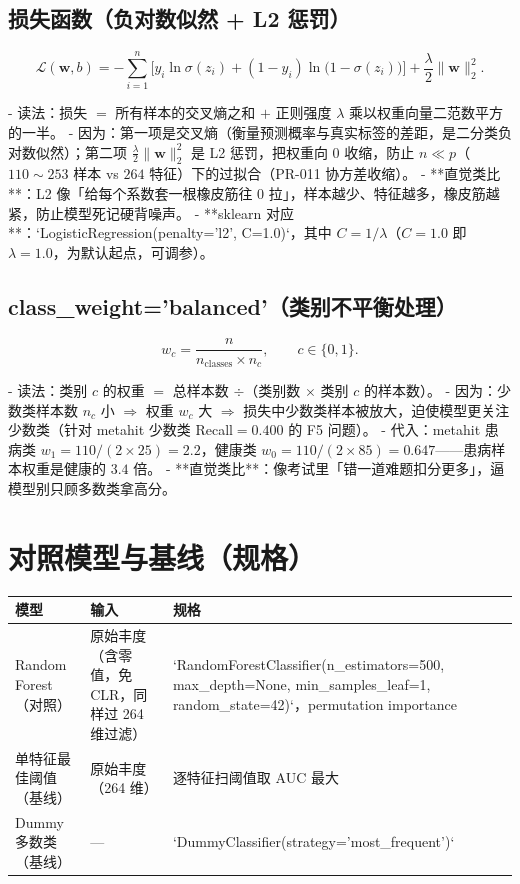 \documentclass{internal-report}
\begin{document}
\subsection{损失函数（负对数似然 + L2 惩罚）}

\begin{equation}
  \mathcal{L}(\mathbf{w},b) =
  -\sum_{i=1}^{n}\Big[y_i\ln\sigma(z_i) + (1-y_i)\ln\big(1-\sigma(z_i)\big)\Big]
  + \frac{\lambda}{2}\lVert\mathbf{w}\rVert_2^2.
  \label{eq:loss}
\end{equation}

- 读法：损失 $=$ 所有样本的交叉熵之和 $+$ 正则强度 $\lambda$ 乘以权重向量二范数平方的一半。
- 因为：第一项是交叉熵（衡量预测概率与真实标签的差距，是二分类负对数似然）；第二项 $\frac{\lambda}{2}\lVert\mathbf{w}\rVert_2^2$ 是 L2 惩罚，把权重向 0 收缩，防止 $n\ll p$（$110\sim253$ 样本 vs $264$ 特征）下的过拟合（PR-011 协方差收缩）。
- **直觉类比**：L2 像「给每个系数套一根橡皮筋往 0 拉」，样本越少、特征越多，橡皮筋越紧，防止模型死记硬背噪声。
- **sklearn 对应**：`LogisticRegression(penalty='l2', C=1.0)`，其中 $C=1/\lambda$（$C=1.0$ 即 $\lambda=1.0$，为默认起点，可调参）。

\subsection{class\_weight='balanced'（类别不平衡处理）}
\label{sec:classweight}

\begin{equation}
  w_c = \frac{n}{n_{\text{classes}} \times n_c},
  \qquad
  c \in \{0,1\}.
  \label{eq:classweight}
\end{equation}

- 读法：类别 $c$ 的权重 $=$ 总样本数 $\div$（类别数 $\times$ 类别 $c$ 的样本数）。
- 因为：少数类样本数 $n_c$ 小 $\Rightarrow$ 权重 $w_c$ 大 $\Rightarrow$ 损失中少数类样本被放大，迫使模型更关注少数类（针对 metahit 少数类 Recall$=0.400$ 的 F5 问题）。
- 代入：metahit 患病类 $w_1 = 110/(2\times25) = 2.2$，健康类 $w_0 = 110/(2\times85) = 0.647$——患病样本权重是健康的 $3.4$ 倍。
- **直觉类比**：像考试里「错一道难题扣分更多」，逼模型别只顾多数类拿高分。

\section{对照模型与基线（规格）}

\begin{center}
\footnotesize
\begin{tabular}{p{3.0cm}p{4.2cm}p{6.2cm}}
\toprule
模型 & 输入 & 规格 \\
\midrule
Random Forest（对照） & 原始丰度（含零值，免 CLR，同样过 264 维过滤） & `RandomForestClassifier(n\_estimators=500, max\_depth=None, min\_samples\_leaf=1, random\_state=42)`，permutation importance \\
单特征最佳阈值（基线） & 原始丰度（264 维） & 逐特征扫阈值取 AUC 最大 \\
Dummy 多数类（基线） & — & `DummyClassifier(strategy='most\_frequent')` \\
\bottomrule
\end{tabular}
\end{center}
\end{document}

